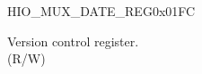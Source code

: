 \begin{register}{H}{IO\_MUX\_DATE\_REG}{0x01FC}\label{regdesc:IOMUXDATEREG}
%
%
\regnewline%
\begin{regdesc}\begin{reglist}
\label{fielddesc:IOMUXREGDATE}\item [IO\_MUX\_REG\_DATE] Version control register.\\(R/W)
\end{reglist}\end{regdesc}
\end{register}
